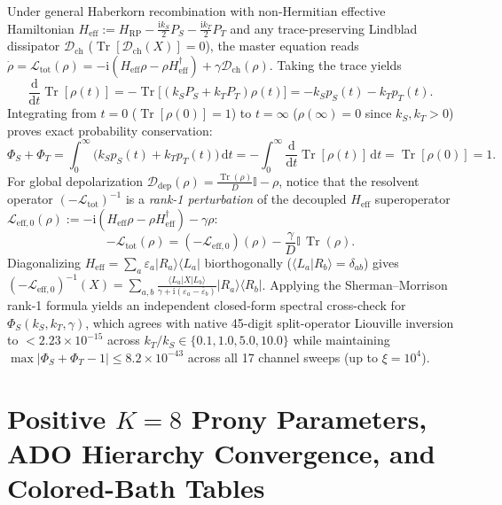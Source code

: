 \documentclass[onecolumn,10pt,notitlepage,amsmath,amssymb,floatfix]{revtex4-2}
\theoremstyle{plain}
\theoremstyle{definition}
\newcommand{\dd}{\mathrm{d}}
\newcommand{\ii}{\mathrm{i}}
\newcommand{\Tr}{\operatorname{Tr}}
\newcommand{\PS}{P_S}
\newcommand{\PT}{P_T}
\newcommand{\HRP}{H_{\mathrm{RP}}}
\begin{document}
Under general Haberkorn recombination with non-Hermitian effective Hamiltonian $H_{\mathrm{eff}} := \HRP - \frac{\ii k_S}{2}\PS - \frac{\ii k_T}{2}\PT$ and any trace-preserving Lindblad dissipator $\mathcal{D}_{\mathrm{ch}}$ ($\Tr[\mathcal{D}_{\mathrm{ch}}(X)] = 0$), the master equation reads $\dot{\rho} = \mathcal{L}_{\mathrm{tot}}(\rho) = -\ii(H_{\mathrm{eff}}\rho - \rho H_{\mathrm{eff}}^\dagger) + \gamma\mathcal{D}_{\mathrm{ch}}(\rho)$. Taking the trace yields
\[
\frac{\dd}{\dd t}\Tr[\rho(t)] = -\Tr\big[(k_S \PS + k_T \PT)\rho(t)\big] = -k_S p_S(t) - k_T p_T(t).
\]
Integrating from $t = 0$ ($\Tr[\rho(0)] = 1$) to $t = \infty$ ($\rho(\infty) = 0$ since $k_S, k_T > 0$) proves exact probability conservation:
\begin{equation}
\label{eq:S3_haberkorn_cons}
\Phi_S + \Phi_T = \int_0^\infty \big(k_S p_S(t) + k_T p_T(t)\big)\,\dd t = -\int_0^\infty \frac{\dd}{\dd t}\Tr[\rho(t)]\,\dd t = \Tr[\rho(0)] = 1.
\end{equation}
For global depolarization $\mathcal{D}_{\mathrm{dep}}(\rho) = \frac{\Tr(\rho)}{D}\mathbb{I} - \rho$, notice that the resolvent operator $(-\mathcal{L}_{\mathrm{tot}})^{-1}$ is a \emph{rank-1 perturbation} of the decoupled $H_{\mathrm{eff}}$ superoperator $\mathcal{L}_{\mathrm{eff},0}(\rho) := -\ii(H_{\mathrm{eff}}\rho - \rho H_{\mathrm{eff}}^\dagger) - \gamma\rho$:
\[
-\mathcal{L}_{\mathrm{tot}}(\rho) = (-\mathcal{L}_{\mathrm{eff},0})(\rho) - \frac{\gamma}{D}\mathbb{I}\,\Tr(\rho).
\]
Diagonalizing $H_{\mathrm{eff}} = \sum_a \varepsilon_a |R_a\rangle\langle L_a|$ biorthogonally ($\langle L_a | R_b \rangle = \delta_{ab}$) gives $(-\mathcal{L}_{\mathrm{eff},0})^{-1}(X) = \sum_{a,b} \frac{\langle L_a|X|L_b\rangle}{\gamma + \ii(\varepsilon_a - \bar{\varepsilon}_b)} |R_a\rangle\langle R_b|$. Applying the Sherman--Morrison rank-1 formula yields an independent closed-form spectral cross-check for $\Phi_S(k_S, k_T, \gamma)$, which agrees with native 45-digit split-operator Liouville inversion to $< 2.23 \times 10^{-15}$ across $k_T/k_S \in \{0.1, 1.0, 5.0, 10.0\}$ while maintaining $\max|\Phi_S + \Phi_T - 1| \le 8.2\times 10^{-43}$ across all 17 channel sweeps (up to $\xi = 10^4$).

\section{Positive \texorpdfstring{$K=8$}{K=8} Prony Parameters, ADO Hierarchy Convergence, and Colored-Bath Tables}
\label{sec:S4}
\end{document}
